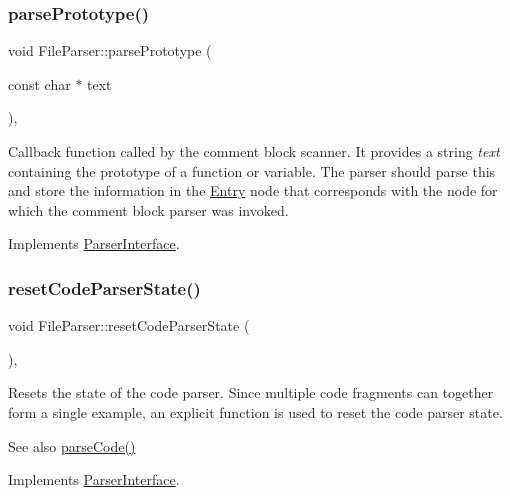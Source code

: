 \subsubsection{\texorpdfstring{parsePrototype()}{parsePrototype()}}
{\footnotesize\ttfamily void File\+Parser\+::parse\+Prototype (\begin{DoxyParamCaption}\item[{const char $\ast$}]{text }\end{DoxyParamCaption})\hspace{0.3cm}{\ttfamily [inline]}, {\ttfamily [virtual]}}

Callback function called by the comment block scanner. It provides a string {\itshape text} containing the prototype of a function or variable. The parser should parse this and store the information in the \mbox{\hyperlink{class_entry}{Entry}} node that corresponds with the node for which the comment block parser was invoked. 

Implements \mbox{\hyperlink{class_parser_interface_a5ebf0f524a296845befa22c85a4cc80b}{Parser\+Interface}}.

\mbox{\label{class_file_parser_af8af94eb387a7ed046f52bc36d2f615a}} 
\subsubsection{\texorpdfstring{resetCodeParserState()}{resetCodeParserState()}}
{\footnotesize\ttfamily void File\+Parser\+::reset\+Code\+Parser\+State (\begin{DoxyParamCaption}{ }\end{DoxyParamCaption})\hspace{0.3cm}{\ttfamily [inline]}, {\ttfamily [virtual]}}

Resets the state of the code parser. Since multiple code fragments can together form a single example, an explicit function is used to reset the code parser state. \begin{DoxySeeAlso}{See also}
\mbox{\hyperlink{class_file_parser_aa9db12f7a11ecbd929a1998fc4ef3b3c}{parse\+Code()}} 
\end{DoxySeeAlso}


Implements \mbox{\hyperlink{class_parser_interface_aee4fccd1865a4e8a6b9f2896811104ca}{Parser\+Interface}}.

\mbox{\label{class_file_parser_a4a8fa3af665adaca443c02ddd3d13d7d}} 
